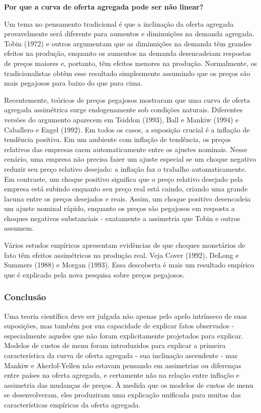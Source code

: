 \documentclass[a4paper,12pt]{article}[abntex2]
\begin{document}
\textbf{Por que a curva de oferta agregada pode ser não linear?}

Um tema no pensamento tradicional é que a inclinação da oferta agregada provavelmente será diferente para aumentos e diminuições na demanda agregada. Tobin (1972) e outros argumentam que as diminuições na demanda têm grandes efeitos na produção, enquanto os aumentos na demanda desencadeiam respostas de preços maiores e, portanto, têm efeitos menores na produção. Normalmente, os tradicionalistas obtêm esse resultado simplesmente assumindo que os preços são mais pegajosos para baixo do que para cima.

Recentemente, teóricos de preços pegajosos mostraram que uma curva de oferta agregada assimétrica surge endogenamente sob condições naturais. Diferentes versões do argumento aparecem em Tsiddon (1993), Ball e Mankiw (1994) e Caballero e Engel (1992). Em todos os casos, a suposição crucial é a inflação de tendência positiva. Em um ambiente com inflação de tendência, os preços relativos das empresas caem automaticamente entre os ajustes nominais. Nesse cenário, uma empresa não precisa fazer um ajuste especial se um choque negativo reduzir seu preço relativo desejado: a inflação faz o trabalho automaticamente. Em contraste, um choque positivo significa que o preço relativo desejado pela empresa está subindo enquanto seu preço real está caindo, criando uma grande lacuna entre os preços desejados e reais. Assim, um choque positivo desencadeia um ajuste nominal rápido, enquanto os preços são pegajosos em resposta a choques negativos substanciais - exatamente a assimetria que Tobin e outros assumem.

Vários estudos empíricos apresentam evidências de que choques monetários de fato têm efeitos assimétricos na produção real. Veja Cover (1992), DeLong e Summers (1988) e Morgan (1993). Essa descoberta é mais um resultado empírico que é explicado pela nova pesquisa sobre preços pegajosos.

\subsubsection{\textbf{Conclusão}}

Uma teoria científica deve ser julgada não apenas pelo apelo intrínseco de suas suposições, mas também por sua capacidade de explicar fatos observados - especialmente aqueles que não foram explicitamente projetados para explicar. Modelos de custos de menu foram introduzidos para explicar a primeira característica da curva de oferta agregada - sua inclinação ascendente - mas Mankiw e Akerlof-Yellen não estavam pensando em assimetrias ou diferenças entre países na oferta agregada, e certamente não na relação entre inflação e assimetria das mudanças de preços. À medida que os modelos de custos de menu se desenvolveram, eles produziram uma explicação unificada para muitas das características empíricas da oferta agregada.
\end{document}
